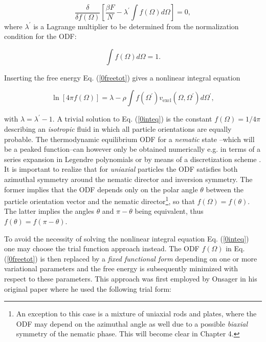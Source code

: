 \begin{equation}
\frac{\delta}{\delta f(\Omega)} \left[\frac{\beta F}{N}-\lambda^{\prime} \int f(\Omega)d \Omega \right]=0,
\label{0statcond}
\end{equation}
where $\lambda^{\prime}$ is a Lagrange multiplier to be determined from the normalization condition for the ODF:

\begin{equation}
\int f(\Omega)d\Omega =1.
\end{equation}

Inserting the free energy Eq. (\ref{0freetot}) gives a nonlinear integral equation

\begin{equation}
\ln[4\pi f(\Omega)]=\lambda - \rho \int f(\Omega^{\prime})v_{\text{excl}}(\Omega,\Omega^{\prime})
d\Omega^{\prime}, \label{0inteq}
\end{equation}

with $\lambda=\lambda^{\prime}-1$. A trivial solution to Eq. (\ref{0inteq}) is the constant $f(\Omega)=1/4\pi$ describing an {\em isotropic} fluid in which all particle orientations are equally probable. The thermodynamic equilibrium ODF for a {\em nematic} state --which will be a peaked function--can however only be obtained numerically e.g. in terms of a series expansion in Legendre polynomials \cite{kayser,lasher,lakatos} or by means of a discretization scheme \cite{herzfeldgrid}. It is important to realize that for  {\em uniaxial} particles the ODF satisfies both azimuthal symmetry around the nematic director and inversion symmetry. The former implies that the ODF depends only on the  polar angle $\theta$ between the particle orientation vector and the nematic director\footnote{An exception to this case is a mixture of uniaxial rods and plates,
where the ODF may depend on the azimuthal angle as well
due to a possible {\em biaxial} symmetry of the nematic phase.
This will become clear in Chapter 4.}, so that $f(\Omega)=f(\theta)$. The latter  implies the angles $\theta$ and $\pi-\theta$ being equivalent, thus $f(\theta)=f(\pi-\theta)$.

To avoid the necessity of solving the nonlinear integral equation Eq. (\ref{0inteq}) one may choose the trial function approach instead. The ODF $f(\Omega)$ in Eq. (\ref{0freetot}) is then replaced by a {\em fixed functional form} depending on one or more variational parameters and the free energy is subsequently minimized with respect to these parameters. This approach was first employed by Onsager  in his original paper \cite{onsager1949} where he used the following trial form:

